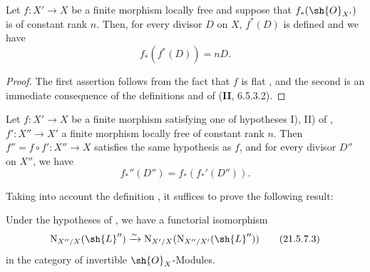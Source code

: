 \begin{proposition}[21.5.6]
\label{IV.21.5.6}
Let $f:X'\to X$ be a finite morphism locally free and suppose that $f_*(\sh{O}_{X'})$ is of constant rank $n$.
Then, for every divisor $D$ on $X$, $f^*(D)$ is defined and we have
\[
\label{IV.21.5.6.1}
  f_*(f^*(D))=nD.
  \tag{21.5.6.1}
\]
\end{proposition}

\begin{proof}
The first assertion follows from the fact that $f$ is flat , and the second is an immediate consequence of the definitions and of (\textbf{II}, 6.5.3.2).
\end{proof}

\begin{proposition}[21.5.7]
\label{IV.21.5.7}
Let $f:X'\to X$ be a finite morphism satisfying one of hypotheses I), II) of , $f':X''\to X'$ a finite morphism locally free of constant rank $n$.
Then $f''=f\circ f':X''\to X$ satisfies the same hypothesis as $f$, and for every divisor $D''$ on $X''$, we have
\[
\label{IV.21.5.7.1}
  f_*''(D'')=f_*(f_*'(D'')).
  \tag{21.5.7.1}
\]
\end{proposition}

Taking into account the definition , it suffices to prove the following result:

\begin{lemma}[21.5.7.2]
\label{IV.21.5.7.2}
Under the hypotheses of , we have a functorial isomorphism
\[
\label{IV.21.5.7.3}
  \mathrm{N}_{X''/X}(\sh{L}'')\xrightarrow{\sim}\mathrm{N}_{X'/X}(\mathrm{N}_{X''/X'}(\sh{L}''))
  \tag{21.5.7.3}
\]
in the category of invertible $\sh{O}_X$-Modules.
\end{lemma}

